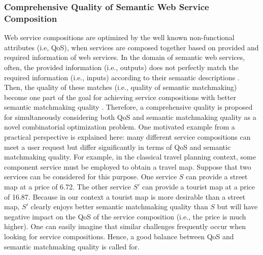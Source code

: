 \subsubsection{Comprehensive Quality of Semantic Web Service Composition}\label{SC:hybridisation}
Web service compositions are optimized by the well known non-functional attributes (i.e, QoS), when services are composed together based on provided and required information of web services. In the domain of semantic web services, often, the provided information (i.e., outputs) does not perfectly match the required information (i.e., inputs) according to their semantic descriptions \cite{lecue2008optimizing}. Then, the quality of these matches (i.e., quality of semantic matchmaking) become one part of the goal for achieving service compositions with better semantic matchmaking quality \cite{lecue2009optimizing}. Therefore, a comprehensive quality is proposed for simultaneously considering both QoS and semantic matchmaking quality as a novel combinatorial optimization problem. One motivated example from a practical perspective is explained here: many different service compositions can meet a user request but differ significantly in terms of QoS and semantic matchmaking quality. For example, in the classical travel planning context, some component service must be employed to obtain a travel map. Suppose that two services can be considered for this purpose. One service $S$ can provide a street map at a price of 6.72. The other service $S'$ can provide a tourist map at a price of 16.87. Because in our context a tourist map is more desirable than a street map, $S'$ clearly enjoys better semantic matchmaking quality than $S$ but will have negative impact on the QoS of the service composition (i.e., the price is much higher). One can easily imagine that similar challenges frequently occur when looking for service compositions. Hence, a good balance between QoS and semantic matchmaking quality is called for.

